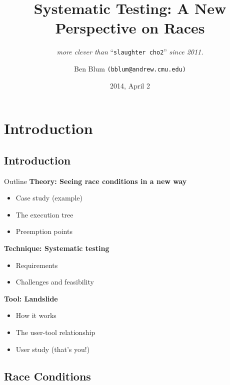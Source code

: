 \documentclass[xcolor=dvipsnames]{beamer}
\title[Landslide]{{\bf Systematic Testing: A New Perspective on Races}}
\subtitle[]{ {\em more clever than } ``\texttt{slaughter cho2}'' {\em since 2011.}}
\author[Ben Blum]{Ben Blum \texttt{(bblum@andrew.cmu.edu)}}
\institute[CMU 15-410]{Carnegie Mellon University - 15-410}
\date[]{2014, April 2}
\begin{document}
\normalem
\begin{frame}
	\titlepage
\end{frame}


\newcommand\linegap{\vspace{0.2in}}
\newcommand\breakslide[1]{\begin{frame}{} \begin{center} #1 \end{center} \end{frame}}

\section{Introduction}
\subsection{Introduction}

\begin{frame}{Outline}
	\textbf{Theory: Seeing race conditions in a new way}
	\begin{itemize}
		\item Case study (example)
		\item The execution tree
		\item Preemption points
	\end{itemize}
	{\bf Technique: Systematic testing}
	\begin{itemize}
		\item Requirements
		\item Challenges and feasibility
	\end{itemize}
	{\bf Tool: Landslide}
	\begin{itemize}
		\item How it works
		\item The user-tool relationship
		\item User study (that's you!)
	\end{itemize}
\end{frame}

\subsection{Race Conditions}
\end{document}

